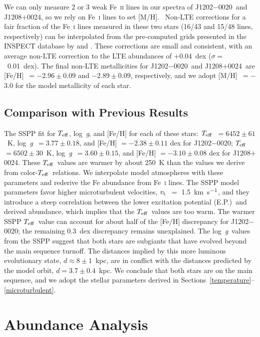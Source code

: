 \documentclass[twocolumn,tighten]{aastex62}
\newcommand{\jtwo}{J1202$-$0020}
\newcommand{\jeight}{J1208$+$0024}
\newcommand{\kmsec}{\mbox{km~s$^{\rm -1}$}}
\newcommand{\logg}{\mbox{log~{\it g}}}
\newcommand{\teff}{\mbox{$T_{\rm eff}$}}
\newcommand{\vt}{\mbox{$v_{\rm t}$}}
\begin{document}
We can only measure 2 or 3 weak
Fe~\textsc{ii} lines in our spectra of \jtwo\ and \jeight,
so we rely on Fe~\textsc{i} lines to set [M/H].~
Non-LTE corrections for a fair fraction of the Fe~\textsc{i} lines
measured in these two stars (16/43 and 15/48 lines, respectively) 
can be interpolated from the pre-computed grids presented 
in the INSPECT database by
\citet{bergemann12} and \citet{lind12}.
These corrections are small and consistent, with an average
non-LTE correction to the LTE abundances of 
$+$0.04~dex ($\sigma =$~0.01~dex).
The final non-LTE metallicities for \jtwo\ and \jeight\ are
[Fe/H]~$= -2.96 \pm 0.09$ and $-2.89 \pm 0.09$, 
respectively, and
we adopt [M/H]~$= -$3.0 for the model metallicity of each star.


\subsection{Comparison with Previous Results}
\label{previous}


The SSPP fit for \teff, \logg, and [Fe/H] for each of these stars:\
\teff\ $= 6452 \pm 61$~K,
\logg\ $= 3.77 \pm 0.18$, and 
[Fe/H] $= -2.38 \pm 0.11$ dex 
for \jtwo;
\teff\ $= 6502 \pm 30$~K,
\logg\ $= 3.60 \pm 0.15$, and 
[Fe/H] $= -3.10 \pm 0.08$ dex 
for \jeight.
These \teff\ values are warmer by about 250~K than the values we
derive from color-\teff\ relations.
We interpolate model atmospheres with these parameters 
and rederive the Fe abundance from Fe~\textsc{i} lines.
The SSPP model parameters
favor higher microturbulent velocities,
\vt\ $=$ 1.5~\kmsec, and 
they introduce a steep correlation
between the lower excitation potential (E.P.)\
and derived abundance,
which implies that the \teff\ values are too warm.
The warmer SSPP \teff\ value can account for
about half of the [Fe/H] discrepancy for \jtwo;
the remaining 0.3~dex discrepancy remains unexplained.
The \logg\ values from the SSPP
suggest that both stars are subgiants that have evolved beyond the 
main sequence turnoff.
The distances implied by this more luminous evolutionary state,
$d\approx 8 \pm 1$~kpc, are in  
conflict with the distances predicted by the 
model orbit, $d=3.7 \pm 0.4$~kpc.
We conclude that both stars are on the main sequence,
and we adopt the stellar parameters derived in 
Sections~\ref{temperature}--\ref{microturbulent}.


\section{Abundance Analysis}
\label{abundances}
\end{document}
